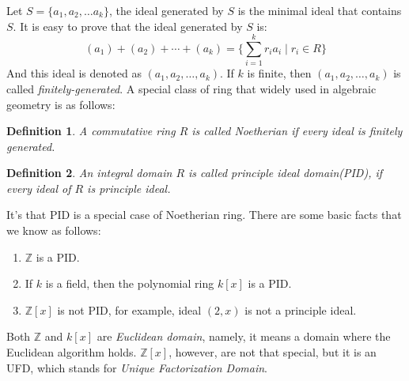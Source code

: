\documentclass[a4paper, pdf, 11.5pt]{article}
\newtheorem{definition}{Definition}
\begin{document}
Let $S=\{a_1, a_2,\ldots a_{k}\}$, the ideal generated by $S$ is the minimal ideal that contains 
$S$. It is easy to prove that the ideal generated by $S$ is:
$$
(a_1) + (a_2) + \cdots + (a_k) = \{\sum_{i=1}^{k}r_{i}a_{i}\mid r_{i}\in R\}
$$
And this ideal is denoted as $(a_1, a_2,\ldots, a_{k})$. If $k$ is finite, then $(a_1, a_2,\ldots, a_{k})$ is 
called \textit{finitely-generated}. A special class of ring that widely used in algebraic geometry is as follows:
\begin{definition}
  A commutative ring $R$ is called Noetherian if every ideal is finitely generated.
\end{definition}

\begin{definition}
  An integral domain $R$ is called principle ideal domain(PID), if every ideal of $R$ is principle ideal.
\end{definition}
\vspace{0.3cm}
\noindent
It's that PID is a special case of Noetherian ring. There are some basic facts that we know as follows:
\begin{enumerate}
  \item $\mathbb{Z}$ is a PID.
  \item If $k$ is a field, then the polynomial ring $k[x]$ is a PID.
  \item $\mathbb{Z}[x]$ is not PID, for example, ideal $(2, x)$ is not a principle ideal.
\end{enumerate}
Both $\mathbb{Z}$ and $k[x]$ are \textit{Euclidean domain}, namely, it means a domain where 
the Euclidean algorithm holds. $\mathbb{Z}[x]$, however, are not that special, but it is an
UFD, which stands for \textit{Unique Factorization Domain}.
\end{document}
